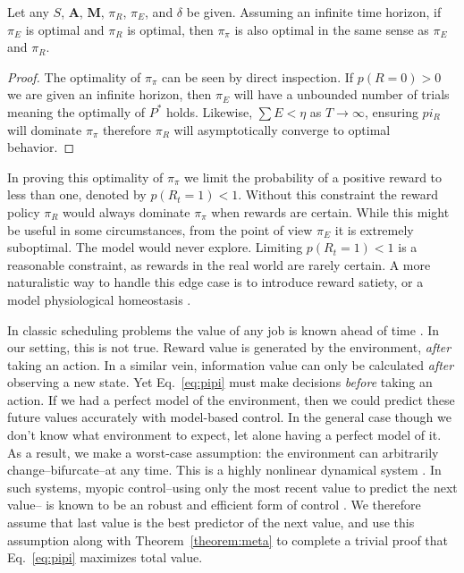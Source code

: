 \begin{theorem}[$\pi_{\pi}$ is unbiased] \label{theorem:meta} 
	 Let any $S$, $\mathbf{A}$, $\mathbf{M}$, $\pi_R$, $\pi_E$, and $\delta$ be given. Assuming an infinite time horizon, if $\pi_E$ is optimal and $\pi_R$ is optimal, then $\pi_{\pi}$ is also optimal in the same sense as $\pi_E$ and $\pi_R$. 
\end{theorem}
\begin{proof}
	The optimality of $\pi_{\pi}$ can be seen by direct inspection. If $p(R = 0) > 0$ we are given an infinite horizon, then $\pi_E$ will have a unbounded number of trials meaning the optimally of $P^*$ holds. Likewise, $\sum E < \eta$ as $T \rightarrow \infty$, ensuring $pi_R$ will dominate $\pi_{\pi}$ therefore $\pi_R$ will asymptotically converge to optimal behavior. 
\end{proof}

In proving this optimality of $\pi_{\pi}$ we limit the probability of a positive reward to less than one, denoted by $p(R_t = 1) < 1$. Without this constraint the reward policy $\pi_R$ would always dominate $\pi_{\pi}$ when rewards are certain. While this might be useful in some circumstances, from the point of view $\pi_E$ it is extremely suboptimal. The model would never explore. Limiting $p(R_t = 1) < 1$ is a reasonable constraint, as rewards in the real world are rarely certain. A more naturalistic way to handle this edge case is to introduce reward satiety, or a model physiological homeostasis \citep{Keramati2014,Juechems2019}.

In classic scheduling problems the value of any job is known ahead of time \citep{Bellmann1954,Roughgarden2019}. In our setting, this is not true. Reward value is generated by the environment, \textit{after} taking an action. In a similar vein, information value can only be calculated \textit{after} observing a new state. Yet Eq.~\ref{eq:pipi} must make decisions \textit{before} taking an action. If we had a perfect model of the environment, then we could predict these future values accurately with model-based control. In the general case though we don't know what environment to expect, let alone having a perfect model of it. As a result, we make a worst-case assumption: the environment can arbitrarily change--bifurcate--at any time. This is a highly nonlinear dynamical system \citep{Strogatz1994}. In such systems, myopic control--using only the most recent value to predict the next value-- is known to be an robust and efficient form of control \citep{Hocker2019}. We therefore assume that last value is the best predictor of the next value, and use this assumption along with Theorem~\ref{theorem:meta} to complete a trivial proof that Eq.~\ref{eq:pipi} maximizes total value.

